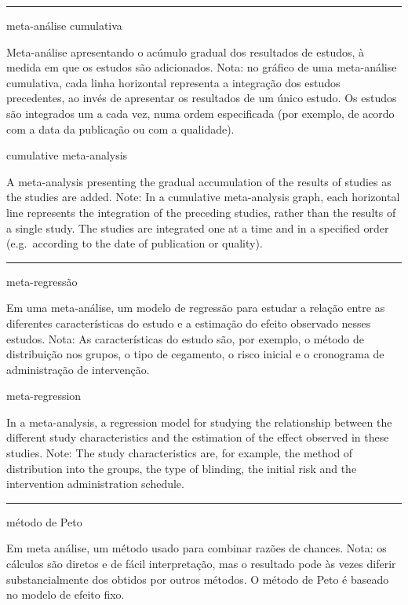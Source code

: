 \documentclass[
]{book}
\begin{document}
\begin{center}\rule{0.5\linewidth}{0.5pt}\end{center}

meta-análise cumulativa

Meta-análise apresentando o acúmulo gradual dos resultados de estudos, à medida em que os estudos são adicionados. Nota: no gráfico de uma meta-análise cumulativa, cada linha horizontal representa a integração dos estudos precedentes, ao invés de apresentar os resultados de um único estudo. Os estudos são integrados um a cada vez, numa ordem especificada (por exemplo, de acordo com a data da publicação ou com a qualidade).

cumulative meta-analysis

A meta-analysis presenting the gradual accumulation of the results of studies as the studies are added. Note: In a cumulative meta-analysis graph, each horizontal line represents the integration of the preceding studies, rather than the results of a single study. The studies are integrated one at a time and in a specified order (e.g.~according to the date of publication or quality).

\begin{center}\rule{0.5\linewidth}{0.5pt}\end{center}

meta-regressão

Em uma meta-análise, um modelo de regressão para estudar a relação entre as diferentes características do estudo e a estimação do efeito observado nesses estudos. Nota: As características do estudo são, por exemplo, o método de distribuição nos grupos, o tipo de cegamento, o risco inicial e o cronograma de administração de intervenção.

meta-regression

In a meta-analysis, a regression model for studying the relationship between the different study characteristics and the estimation of the effect observed in these studies. Note: The study characteristics are, for example, the method of distribution into the groups, the type of blinding, the initial risk and the intervention administration schedule.

\begin{center}\rule{0.5\linewidth}{0.5pt}\end{center}

método de Peto

Em meta análise, um método usado para combinar razões de chances. Nota: os cálculos são diretos e de fácil interpretação, mas o resultado pode às vezes diferir substancialmente dos obtidos por outros métodos. O método de Peto é baseado no modelo de efeito fixo.
\end{document}
